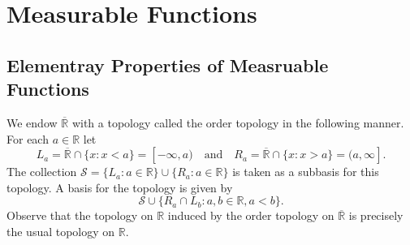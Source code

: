 \documentclass[../main.tex]{subfiles}
\begin{document}
\ifSubfilesClassLoaded{

    \tableofcontents
    
}{}

\chapter{ Measurable Functions }

\section{Elementray Properties of Measruable Functions}

\begin{definition}{}{}
    We endow $\overline{\mathbb{R}}$ with a topology called the order topology in the following manner. For each $a \in \mathbb{R}$ let
\[
L_a = \overline{\mathbb{R}} \cap \{x : x < a\} = [-\infty, a) \quad \text{and} \quad R_a = \overline{\mathbb{R}} \cap \{x : x > a\} = (a, \infty].
\]
The collection $\mathcal{S} = \{L_a : a \in \mathbb{R}\} \cup \{R_a : a \in \mathbb{R}\}$ is taken as a subbasis for this topology. A basis for the topology is given by
\[
\mathcal{S} \cup \{R_a \cap L_b : a, b \in \mathbb{R}, a < b\}.
\]
Observe that the topology on $\mathbb{R}$ induced by the order topology on $\overline{\mathbb{R}}$ is precisely the usual topology on $\mathbb{R}$.
\end{definition}
\end{document}
